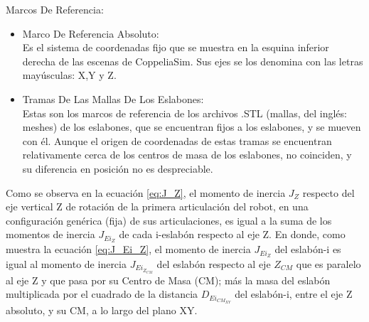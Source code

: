 \documentclass{article}
\begin{document}
\begin{sloppypar}
\hfill \break
Marcos De Referencia:
\begin{itemize}
    \item Marco De Referencia Absoluto:
        \\ Es el sistema de coordenadas fijo que se muestra en la esquina inferior derecha de las escenas de CoppeliaSim. Sus ejes se los denomina con las letras mayúsculas: X,Y y Z.
    \item Tramas De Las Mallas De Los Eslabones:
        \\ Estas son los marcos de referencia de los archivos .STL (mallas, del inglés: meshes) de los eslabones, que se encuentran fijos a los eslabones, y se mueven con él. Aunque el origen de coordenadas de estas tramas se encuentran relativamente cerca de los centros de masa de los eslabones, no coinciden, y su diferencia en posición no es despreciable.
\end{itemize}


Como se observa en la ecuación \ref{eq:J_Z}, el momento de inercia $J_Z$ respecto del eje vertical Z de rotación de la primera articulación del robot, en una configuración genérica (fija) de sus articulaciones, es igual a la suma de los momentos de inercia $J_{Ei_Z}$ de cada i-eslabón respecto al eje Z. En donde, como muestra la ecuación \ref{eq:J_Ei_Z}, el momento de inercia $J_{Ei_Z}$ del eslabón-i es igual al momento de inercia $J_{Ei_{Z_{CM}}}$ del eslabón respecto al eje $Z_{CM}$ que es paralelo al eje Z y que pasa por su Centro de Masa (CM); más la masa del eslabón multiplicada por el cuadrado de la distancia $D_{Ei_{CM_{XY}}}$ del eslabón-i, entre el eje Z absoluto, y su CM, a lo largo del plano XY.


\end{sloppypar}
\end{document}
